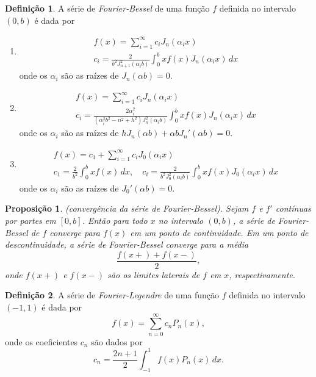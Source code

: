 \documentclass{article}
\theoremstyle{plain}
\newtheorem{prop}[thm]{Proposição}
\theoremstyle{definition}
\newtheorem{defn}{Definição}[section]
\theoremstyle{remark}
\begin{document}
\begin{defn}
    A série de \emph{Fourier-Bessel} de uma função \(f\) definida no intervalo \((0,b)\) é dada por
    \begin{enumerate}
        \item [(i)] \begin{gather}
            f(x) = \sum_{i=1}^{\infty} c_i J_n(\alpha_{i}x) \\
            c_i = \frac{2}{b^2 J_{n+1}^2(\alpha_i b)} \int_0^b x f(x) J_n(\alpha_i x) \, dx
        \end{gather}
        \noindent onde os \(\alpha_i\) são as raízes de \(J_n(\alpha b) = 0\).
        \item [(ii)] \begin{gather}
            f(x) = \sum_{i=1}^{\infty} c_i J_n(\alpha_{i}x) \\
            c_i = \frac{2\alpha_{i}^2}{(\alpha_{i}^2 b^2 - n^2 + h^2)J_n^2(\alpha_i b)} \int_0^b x f(x) J_n(\alpha_i x) \, dx
        \end{gather}
        \noindent onde os \(\alpha_i\) são as raízes de \(h J_n(\alpha b) + \alpha b J_n'(\alpha b) = 0\).
        \item [(iii)] \begin{gather}
            f(x) = c_1 + \sum_{i=1}^{\infty} c_i J_0(\alpha_{i}x) \\
            c_1 = \frac{2}{b^2} \int_0^b x f(x) \, dx, \quad c_i = \frac{2}{b^2 J_0^2(\alpha_i b)} \int_0^b x f(x) J_0(\alpha_i x) \, dx
        \end{gather}
        \noindent onde os \(\alpha_i\) são as raízes de \(J_0'(\alpha b) = 0\).
    \end{enumerate}
\end{defn}

\begin{prop} (convergência da série de Fourier-Bessel).
    Sejam \(f\) e \(f'\) contínuas por partes em \([0,b]\). Então para todo \(x\) no intervalo \((0,b)\), a série de Fourier-Bessel de \(f\) converge para \(f(x)\) em um ponto de continuidade. Em um ponto de descontinuidade, a série de Fourier-Bessel converge para a média
    \begin{equation*}
        \frac{f(x+) + f(x-)}{2},
    \end{equation*}
    \noindent onde \(f(x+)\) e \(f(x-)\) são os limites laterais de \(f\) em \(x\), respectivamente.
\end{prop}

\begin{defn}
    A série de \emph{Fourier-Legendre} de uma função \(f\) definida no intervalo \((-1,1)\) é dada por
    \begin{equation}
        f(x) = \sum_{n=0}^{\infty} c_n P_n(x),
    \end{equation}
    \noindent onde os coeficientes \(c_n\) são dados por
    \begin{equation}
        c_n = \frac{2n+1}{2} \int_{-1}^{1} f(x) P_n(x) \, dx.
\end{equation}
\end{defn}
\end{document}
